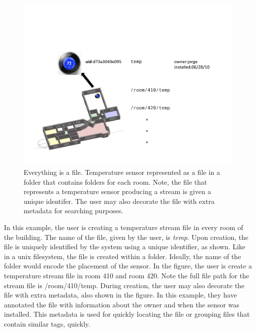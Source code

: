\begin{figure}[t!] %
\centering
\includegraphics[width=0.65\columnwidth]{figs/everythingfile}
\caption{Everything is a file.  Temperature sensor represented as a file in a folder that contains folders for each room.
Note, the file that represents a temperature sensor producing a stream is given a unique identifer.  The user may also
decorate the file with extra metadata for searching purposes.}
\label{fig:everythingfile}
\end{figure}

In this example, the user is creating a temperature stream file in every room of the building.  The name of the file, given by the user,
is \emph{temp}.  Upon creation, the file is uniquely identified by the system using a unique identifier, as shown.  Like in a unix filesystem, the
file is created within a folder.  Ideally, the name of the folder would encode the placement of the sensor.  In the figure, the 
user is create a temperature stream file in room 410 and room 420.  Note the full file path for the stream file is /room/410/temp.
During creation, the user may also decorate the file with extra metadata, also shown in the figure.  In this example, they have annotated
the file with information about the owner and when the sensor was installed.   This metadata is used for quickly locating the file
or grouping files that contain similar tags, quickly.


